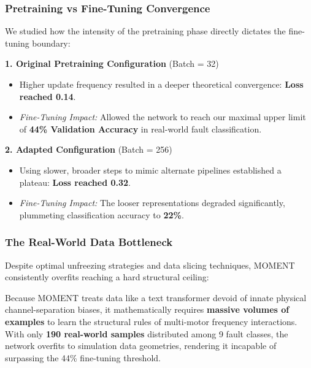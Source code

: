 \documentclass[10pt, aspectratio=169]{beamer}
\begin{document}
\begin{frame}
    \frametitle{Pretraining vs Fine-Tuning Convergence}
    We studied how the intensity of the pretraining phase directly dictates the fine-tuning boundary:
    
    \vspace{0.3cm}
    \textbf{1. Original Pretraining Configuration} (Batch = 32)
    \begin{itemize}
        \item Higher update frequency resulted in a deeper theoretical convergence: \textbf{Loss reached 0.14}.
        \item \textit{Fine-Tuning Impact:} Allowed the network to reach our maximal upper limit of \textbf{44\% Validation Accuracy} in real-world fault classification.
    \end{itemize}
    \vspace{0.2cm}
    \textbf{2. Adapted Configuration} (Batch = 256)
    \begin{itemize}
        \item Using slower, broader steps to mimic alternate pipelines established a plateau: \textbf{Loss reached 0.32}.
        \item \textit{Fine-Tuning Impact:} The looser representations degraded significantly, plummeting classification accuracy to \textbf{22\%}.
    \end{itemize}
\end{frame}

\begin{frame}
    \frametitle{The Real-World Data Bottleneck}
    Despite optimal unfreezing strategies and data slicing techniques, MOMENT consistently overfits reaching a hard structural ceiling:
    \vspace{0.2cm}
    \begin{tcolorbox}[colback=red!5!white,colframe=red!75!black,title=The 190 Samples Limitation vs Inference Bias]
    Because MOMENT treats data like a text transformer devoid of innate physical channel-separation biases, it mathematically requires \textbf{massive volumes of examples} to learn the structural rules of multi-motor frequency interactions. With only \textbf{190 real-world samples} distributed among 9 fault classes, the network overfits to simulation data geometries, rendering it incapable of surpassing the 44\% fine-tuning threshold.
    \end{tcolorbox}
\end{frame}
\end{document}
